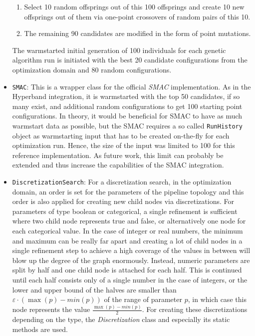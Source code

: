 \begin{itemize}
\begin{enumerate}
            \item Select 10 random offsprings out of this 100 offsprings and create 10 new offsprings out of them via one-point crossovers of random pairs of this 10.
            \item The remaining 90 candidates are modified in the form of point mutations.
        \end{enumerate}
    The warmstarted initial generation of 100 individuals for each genetic algorithm run is initiated with the best 20 candidate configurations from the optimization domain and 80 random configurations.
    \item \texttt{SMAC}: This is a wrapper class for the official \textit{SMAC} implementation.
    As in the Hyperband integration, it is warmstarted with the top 50 candidates, if so many exist, and additional random configurations to get 100 starting point configurations.
    In theory, it would be beneficial for SMAC to have as much warmstart data as possible, but the SMAC requires a so called \texttt{RunHistory} object as warmstarting input that has to be created on-the-fly for each optimization run.
    Hence, the size of the input was limited to 100 for this reference implementation.
    As future work, this limit can probably be extended and thus increase the capabilities of the SMAC integration.
    \item \texttt{DiscretizationSearch}: For a discretization search, in the optimization domain, an order is set for the parameters of the pipeline topology and this order is also applied for creating new child nodes via discretizations.\newline
    For parameters of type boolean or categorical, a single refinement is sufficient where two child node represents true and false, or alternatively one node for each categorical value.
    In the case of integer or real numbers, the minimum and maximum can be really far apart and creating a lot of child nodes in a single refinement step to achieve a high coverage of the values in between will blow up the degree of the graph enormously.
    Instead, numeric parameters are split by half and one child node is attached for each half.
    This is continued until each half consists only of a single number in the case of integers, or the lower and upper bound of the halves are smaller than $\varepsilon \cdot (\max(p) - min(p))$ of the range of parameter $p$, in which case this node represents the value $\frac{\max(p) - min(p)}{2}$.\newline
    For creating these discretizations depending on the type, the \textit{Discretization} class and especially its static methods are used.

\end{itemize}
